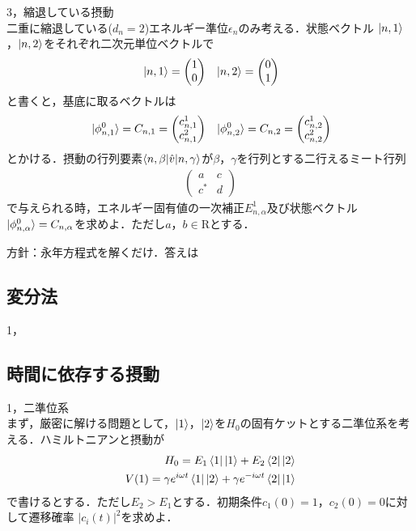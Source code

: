 \documentclass[a4j]{jarticle}
\begin{document}
3，縮退している摂動\\
二重に縮退している($d_n=2$)エネルギー準位$\epsilon_n$のみ考える．状態ベクトル
$\ket{n,1}$，$\ket{n,2}$をそれぞれ二次元単位ベクトルで
\begin{align*}
 &\ket{n,1}=
 \begin{pmatrix}
  1\\
  0
 \end{pmatrix}
 &\ket{n,2}=
 \begin{pmatrix}
  0\\
  1
 \end{pmatrix}
\end{align*}
と書くと，基底に取るベクトルは
\begin{align*}
 &\ket{\phi_{n,1}^0}=C_{n,1}=
 \begin{pmatrix}
  c_{n,1}^1\\
  c_{n,1}^2
 \end{pmatrix}
 &\ket{\phi_{n,2}^0}=C_{n,2}=
 \begin{pmatrix}
  c_{n,2}^1\\
  c_{n,2}^2
 \end{pmatrix}
\end{align*}
とかける．摂動の行列要素$\braket{n,\beta |\hat{v}|n,\gamma}$が$\beta$，$\gamma$を行列とする二行えるミート行列
\begin{align*}
 \begin{pmatrix}
  a&c\\
  c^*&d 
 \end{pmatrix}
\end{align*}
で与えられる時，エネルギー固有値の一次補正$E_{n,\alpha}^1$及び状態ベクトル
$\ket{\phi _{n,\alpha}^0}=C_{n,\alpha}$を求めよ．ただし$a$，$b\in\mathrm{R}$とする．

方針：永年方程式を解くだけ．答えは




\subsection{変分法}
1，

\subsection{時間に依存する摂動}

1，二準位系\\
まず，厳密に解ける問題として，$\ket{1}$，$\ket{2}$を$H_0$の固有ケットとする二準位系を考える．ハミルトニアンと摂動が
\begin{align*}
 H_0=E_1\bra{1}\ket{1}+E_2\bra{2}\ket{2}\\
 V(1)=\gamma e^{i\omega t}\bra{1}\ket{2}+\gamma e^{-i\omega t}\bra{2}\ket{1}
\end{align*}
で書けるとする．ただし$E_2>E_1$とする．初期条件$c_1(0)=1$，$c_2(0)=0$に対して遷移確率
$|c_i(t)|^2$を求めよ．\\
\end{document}
